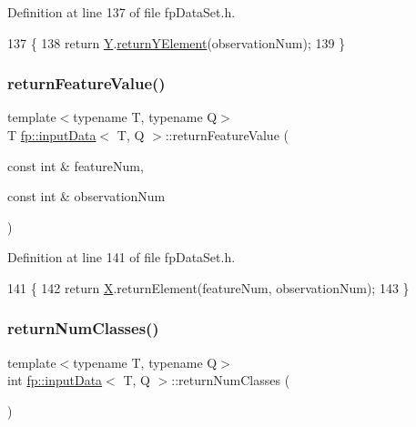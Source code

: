 Definition at line 137 of file fp\+Data\+Set.\+h.


\begin{DoxyCode}
137                                                                     \{
138             \textcolor{keywordflow}{return} \hyperlink{classfp_1_1inputData_a2ec8c0c7b9a8e114673c703edea4283d}{Y}.\hyperlink{classfp_1_1inputYData_a974ab138d49f7e5b3fded09f02486710}{returnYElement}(observationNum);
139         \}
\end{DoxyCode}
\mbox{\label{classfp_1_1inputData_af52ac3512ee8f6e973799e024ddbf629}} 
\subsubsection{\texorpdfstring{return\+Feature\+Value()}{returnFeatureValue()}}
{\footnotesize\ttfamily template$<$typename T, typename Q$>$ \\
T \hyperlink{classfp_1_1inputData}{fp\+::input\+Data}$<$ T, Q $>$\+::return\+Feature\+Value (\begin{DoxyParamCaption}\item[{const int \&}]{feature\+Num,  }\item[{const int \&}]{observation\+Num }\end{DoxyParamCaption})\hspace{0.3cm}{\ttfamily [inline]}}



Definition at line 141 of file fp\+Data\+Set.\+h.


\begin{DoxyCode}
141                                                                                      \{
142             \textcolor{keywordflow}{return} \hyperlink{classfp_1_1inputData_ad19581a60d2af60ebd3c8be5ac5ad95e}{X}.returnElement(featureNum, observationNum);
143         \}
\end{DoxyCode}
\mbox{\label{classfp_1_1inputData_a1e775e3744cb3bacb1a6776054aabe4f}} 
\subsubsection{\texorpdfstring{return\+Num\+Classes()}{returnNumClasses()}}
{\footnotesize\ttfamily template$<$typename T, typename Q$>$ \\
int \hyperlink{classfp_1_1inputData}{fp\+::input\+Data}$<$ T, Q $>$\+::return\+Num\+Classes (\begin{DoxyParamCaption}{ }\end{DoxyParamCaption})\hspace{0.3cm}{\ttfamily [inline]}}



